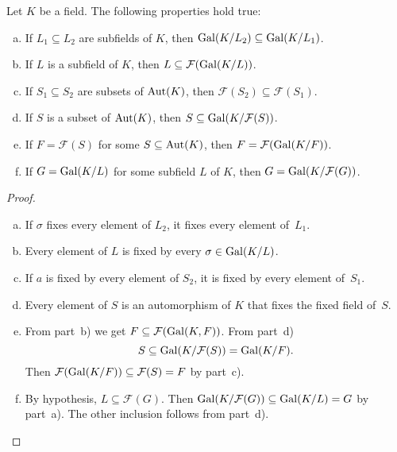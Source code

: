 \begin{lem}\label{lem:fixed-field-properties}
    Let\/ $K$ be a field. The following properties hold true:
    \begin{enumerate}[a), font=\upshape]
        \item If\/ $L_1 \subseteq L_2$ are subfields of\/ $K$, then\/ $\operatorname{Gal}(K/L_2) \subseteq \operatorname{Gal}(K/L_1)$.
        \item If\/ $L$ is a subfield of\/ $K$, then\/ $L \subseteq \mathcal F(\operatorname{Gal}(K/L))$.
        \item If\/ $S_1 \subseteq S_2$ are subsets of\/ ${\rm Aut}(K)$, then\/ $\mathcal F(S_2) \subseteq \mathcal F(S_1)$.
        \item If\/ $S$ is a subset of\/ ${\rm Aut}(K)$, then\/ $S \subseteq \operatorname{Gal}(K/\mathcal F(S))$.
        \item If\/ $F = \mathcal F(S)$ for some\/ $S \subseteq {\rm Aut}(K)$, then\/ $F = \mathcal F(\operatorname{Gal}(K/F))$.
        \item If\/ $G = \operatorname{Gal}(K/L)$ for some subfield\/ $L$ of\/ $K$, then\/ $G = \operatorname{Gal}(K/\mathcal F(G))$.
    \end{enumerate}
\end{lem}

\begin{proof}${}$
    \begin{enumerate}[a), font=\upshape]
        \item If $\sigma$ fixes every element of $L_2$, it fixes every element of~$L_1$.

        \item Every element of $L$ is fixed by every $\sigma\in\operatorname{Gal}(K/L)$.

        \item If $a$ is fixed by every element of $S_2$, it is fixed by every element of~$S_1$.

        \item Every element of $S$ is an automorphism of $K$ that fixes the fixed field of~$S$.

        \item From part~b) we get $F\subseteq\mathcal F(\operatorname{Gal}(K,F))$. From part~d)
        $$
            S\subseteq\operatorname{Gal}(K/\mathcal F(S))=\operatorname{Gal}(K/F).
        $$
        Then $\mathcal F(\operatorname{Gal}(K/F))\subseteq\mathcal F(S)=F$ by part~c).

        \item By hypothesis, $L\subseteq\mathcal F(G)$. Then $\operatorname{Gal}(K/\mathcal F(G))\subseteq\operatorname{Gal}(K/L)=G$ by part~a). The other inclusion follows from part~d).
    \end{enumerate}
\end{proof}


